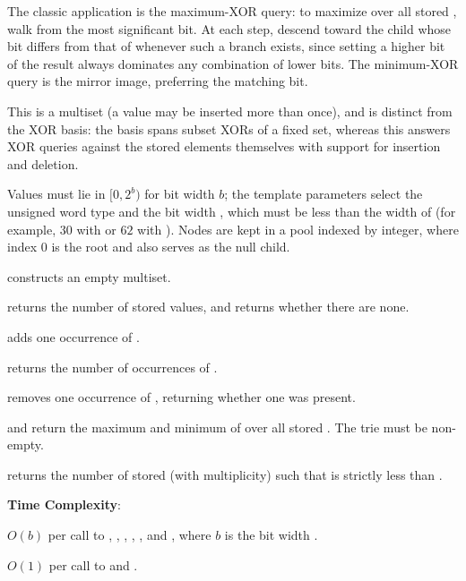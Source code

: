 The classic application is the maximum-XOR query: to maximize  over all stored , walk from the most significant bit. At each step, descend toward the child whose bit differs from that of  whenever such a branch exists, since setting a higher bit of the result always dominates any combination of lower bits. The minimum-XOR query is the mirror image, preferring the matching bit.

This is a multiset (a value may be inserted more than once), and is distinct from the XOR basis: the basis spans subset XORs of a fixed set, whereas this answers XOR queries against the stored elements themselves with support for insertion and deletion.

Values must lie in $[0, 2^b)$ for bit width $b$; the template parameters select the unsigned word type  and the bit width , which must be less than the width of  (for example, $30$ with  or $62$ with ). Nodes are kept in a pool indexed by integer, where index $0$ is the root and also serves as the null child.

\begin{compactitem}
  \item {} constructs an empty multiset.
  \item {} returns the number of stored values, and  returns whether there are none.
  \item {} adds one occurrence of .
  \item {} returns the number of occurrences of .
  \item {} removes one occurrence of , returning whether one was present.
  \item {} and  return the maximum and minimum of  over all stored . The trie must be non-empty.
  \item {} returns the number of stored  (with multiplicity) such that  is strictly less than .
\end{compactitem}

\textbf{Time Complexity}:
\begin{compactitem}
  \item $O(b)$ per call to , , , , , and , where $b$ is the bit width .
  \item $O(1)$ per call to  and .
\end{compactitem}

